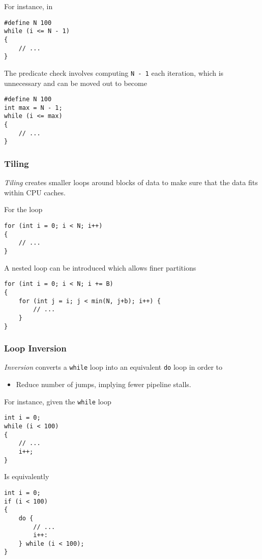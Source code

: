 \begin{example}
    For instance, in
    \begin{verbatim}
#define N 100
while (i <= N - 1) 
{ 
    // ... 
}
    \end{verbatim}
    
    The predicate check involves computing \texttt{N - 1} each iteration, which is unnecessary and can be moved out to become
    \begin{verbatim}
#define N 100
int max = N - 1;
while (i <= max) 
{
    // ...
}
    \end{verbatim}
\end{example}

\subsubsection{Tiling}

\begin{definition}[Tiling]
    \textit{Tiling} creates smaller loops around blocks of data to make sure that the data fits within CPU caches.
\end{definition}

\begin{example}
    For the loop
    \begin{verbatim}
for (int i = 0; i < N; i++)
{
    // ...
}
    \end{verbatim}
    
    A nested loop can be introduced which allows finer partitions
    \begin{verbatim}
for (int i = 0; i < N; i += B)
{
    for (int j = i; j < min(N, j+b); i++) {
        // ...
    }
}
    \end{verbatim}
\end{example}

\subsubsection{Loop Inversion}

\begin{definition}
    \textit{Inversion} converts a \texttt{while} loop into an equivalent \texttt{do} loop in order to
    \begin{itemize}
        \item Reduce number of jumps, implying fewer pipeline stalls.
    \end{itemize}
\end{definition}

\begin{example}
    For instance, given the \texttt{while} loop
    \begin{verbatim}
int i = 0;
while (i < 100)
{
    // ...
    i++;
}
    \end{verbatim}
    
    Is equivalently
    \begin{verbatim}
int i = 0;
if (i < 100)
{
    do {
        // ...
        i++:
    } while (i < 100);
}
    \end{verbatim}
\end{example}

